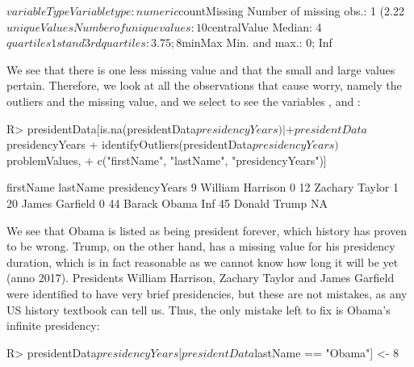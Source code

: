 \documentclass[article,shortnames]{jss}
\begin{document}
\begin{Schunk}
\begin{Soutput}
$variableType
Variable type: numeric
$countMissing
Number of missing obs.: 1 (2.22 %
$uniqueValues
Number of unique values: 10
$centralValue
Median: 4
$quartiles
1st and 3rd quartiles: 3.75; 8
$minMax
Min. and max.: 0; Inf
\end{Soutput}
\end{Schunk}

We see that there is one less missing value and that the small and large values pertain. Therefore, we look at all the observations that cause worry, namely the outliers and the missing value, and we select to see the variables ,  and :

\begin{Schunk}
\begin{Sinput}
R> presidentData[is.na(presidentData$presidencyYears) | 
+    presidentData$presidencyYears %
+    identifyOutliers(presidentData$presidencyYears)$problemValues, 
+    c("firstName", "lastName", "presidencyYears")]
\end{Sinput}
\begin{Soutput}
   firstName lastName presidencyYears
9    William Harrison               0
12   Zachary   Taylor               1
20     James Garfield               0
44    Barack    Obama             Inf
45    Donald    Trump              NA
\end{Soutput}
\end{Schunk}

We see that Obama is listed as being president forever, which history has proven to be wrong. Trump, on the other hand, has a missing value for his presidency duration, which is in fact reasonable as we cannot know how long it will be yet (anno 2017). Presidents William Harrison, Zachary Taylor and James Garfield were identified to have very brief presidencies, but these are not mistakes, as any US history textbook can tell us. Thus, the only mistake left to fix is Obama's infinite presidency:


\begin{Schunk}
\begin{Sinput}
R> presidentData$presidencyYears[presidentData$lastName == "Obama"] <- 8
\end{Sinput}
\end{Schunk}
\end{document}
